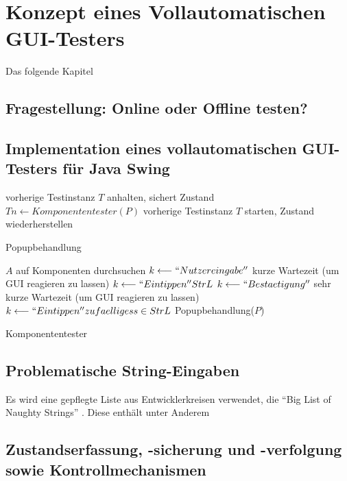 \chapter{Konzept eines Vollautomatischen GUI-Testers}\label{chapter:conceptfullautoguitesting}


Das folgende Kapitel


\section{Fragestellung: Online oder Offline testen?}\label{section:offoronlinetesting}


\section{Implementation eines vollautomatischen GUI-Testers für Java Swing}\label{section:myfullautoguitest}

\begin{algorithm} \SetAlgoLined
	vorherige Testinstanz $T$ anhalten, sichert Zustand\;
	$Tn \longleftarrow Komponententester(P)$\;
	vorherige Testinstanz $T$ starten, Zustand wiederherstellen\;
	\caption{Popupbehandlung}
	\label{alg:autotesterpopup}
\end{algorithm}

\begin{algorithm} \SetAlgoLined
	$A$ auf Komponenten durchsuchen\;
	{
		{
			$k \longleftarrow ``Nutzereingabe''$\;
			kurze Wartezeit (um GUI reagieren zu lassen)
		}
		{
			{
				$k \longleftarrow ``Eintippen'' StrL$\;
				$k \longleftarrow ``Bestaetigung''$\;
				sehr kurze Wartezeit (um GUI reagieren zu lassen)
			}
			$k \longleftarrow ``Eintippen'' zufaelliges s \in StrL$\;
		}
		{
			Popupbehandlung($P$)\;
		}
	}
	\caption{Komponententester}
	\label{alg:autotestermain}
\end{algorithm}


\section{Problematische String-Eingaben}\label{section:naughtystrings}

Es wird eine gepflegte Liste aus Entwicklerkreisen verwendet, die ``Big List of Naughty Strings'' 
\cite{website:naughty-strings}. Diese enthält unter Anderem


\section{Zustandserfassung, -sicherung und -verfolgung sowie Kontrollmechanismen}\label{section:statemonitoring}
